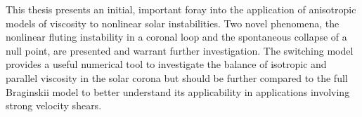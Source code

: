 This thesis presents an initial, important foray into the application of anisotropic models of viscosity to nonlinear solar instabilities. Two novel phenomena, the nonlinear fluting instability in a coronal loop and the spontaneous collapse of a null point, are presented and warrant further investigation. The switching model provides a useful numerical tool to investigate the balance of isotropic and parallel viscosity in the solar corona but should be further compared to the full Braginskii model to better understand its applicability in applications involving strong velocity shears.
